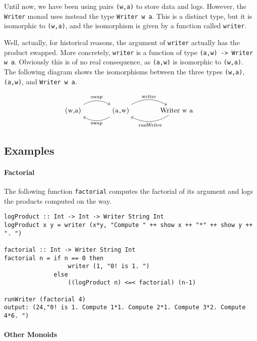 \documentclass[11	pt]{article}
\theoremstyle{nonumberplain}
\newcommand*\lsin{\lstinline}
\newcommand*\lsmath[1]{\text{\lstinline|#1|}}
\begin{document}
Until now, we have been using pairs \lsin|(w,a)| to store data and logs. However, the \lsin|Writer| monad uses instead the type \lsin|Writer w a|. This is a distinct type, but it is isomorphic to \lsin|(w,a)|, and the isomorphism is given by a function called \lsin|writer|.

Well, actually, for historical reasons, the argument of \lsin|writer| actually has the product swapped. More concretely, \lsin|writer| is a function of type \lsin|(a,w) -> Writer w a|. Obviously this is of no real consequence, as \lsin|(a,w)| is isomorphic to \lsin|(w,a)|. The following diagram shows the isomorphisms between the three types \lsin|(w,a)|, \lsin|(a,w)|, and \lsin|Writer w a|.

\begin{equation}
\begin{tikzcd}[column sep = large]
\lsmath{(w,a)} \arrow[r, bend left, "\lsmath{swap}"] & \arrow[l, bend left, "\lsmath{swap}"] \lsmath{(a,w)} \arrow[r, bend left, "\lsmath{writer}"] & \lsmath{Writer w a} \arrow[l, bend left, "\lsmath{runWriter}"]
\end{tikzcd}
\end{equation}

\subsection{Examples}

\paragraph{Factorial}
The following function \lsin|factorial| computes the factorial of its argument and logs the products computed on the way.

\begin{lstlisting}
logProduct :: Int -> Int -> Writer String Int
logProduct x y = writer (x*y, "Compute " ++ show x ++ "*" ++ show y ++ ". ")

factorial :: Int -> Writer String Int
factorial n = if n == 0 then
                  writer (1, "0! is 1. ") 
              else
                  ((logProduct n) <=< factorial) (n-1)

runWriter (factorial 4)
output: (24,"0! is 1. Compute 1*1. Compute 2*1. Compute 3*2. Compute 4*6. ")
\end{lstlisting}

\paragraph{Other Monoids}
\end{document}

